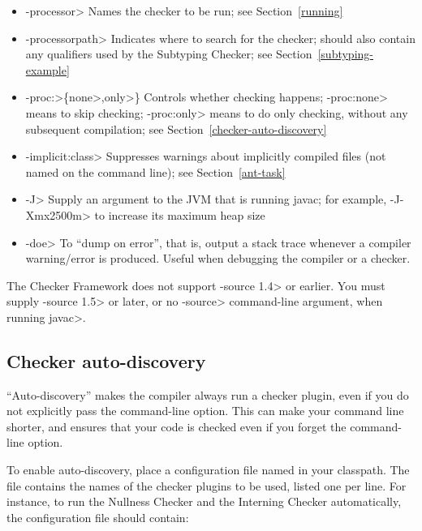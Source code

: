 \begin{itemize}
\item \<-processor> Names the checker to be
  run; see Section~\ref{running}
\item \<-processorpath> Indicates where to search for the
  checker; should also contain any qualifiers used by the Subtyping
  Checker; see Section~\ref{subtyping-example}
\item \<-proc:>\{\<none>,\<only>\} Controls whether checking
  happens; \<-proc:none>
  means to skip checking; \<-proc:only> means to do only
  checking, without any subsequent compilation; see
  Section~\ref{checker-auto-discovery}
\item \<-implicit:class> Suppresses warnings about implicitly compiled files
  (not named on the command line); see Section~\ref{ant-task}
\item \<-J> Supply an argument to the JVM that is running javac;
  for example, \<-J-Xmx2500m> to increase its maximum heap size
\item \<-doe> To ``dump on error'', that is, output a stack trace
  whenever a compiler warning/error is produced. Useful when debugging
  the compiler or a checker.
\end{itemize}

The Checker Framework does not support \<-source 1.4> or earlier.  You must
supply \<-source 1.5> or later, or no \<-source> command-line argument,
when running \<javac>.


\subsection{Checker auto-discovery\label{checker-auto-discovery}}

``Auto-discovery'' makes the  compiler always run a checker
plugin, even if you do not explicitly pass the 
command-line option.  This can make your command line shorter, and ensures
that your code is checked even if you forget the command-line option.

\begin{sloppypar}
To enable auto-discovery, place a configuration file named
in your classpath.  The file contains the names of the checker plugins to
be used, listed one per line.  For instance, to run the Nullness Checker and the
Interning Checker automatically, the configuration file should contain:
\end{sloppypar}

